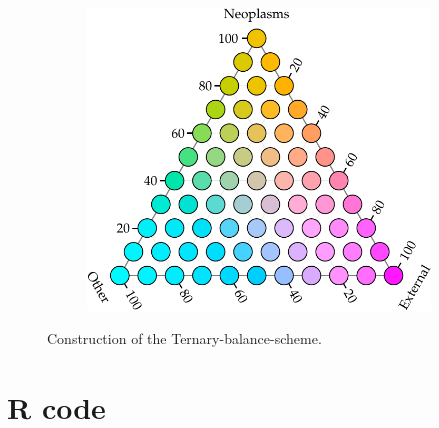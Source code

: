 \documentclass[a4paper]{scrartcl}
\begin{document}
\begin{appendix}
\begin{figure}[htb!]
\begin{subfigure}[t]{0.3\textwidth}
  \label{fig:ternlegend}
  \end{subfigure}%
  ~
  \begin{subfigure}[t]{0.3\textwidth}
  \includegraphics[width = \textwidth]{../fig/plot-tern_balance_lgnd.pdf}
  \label{fig:tbslegend}
  \end{subfigure}
  \caption{Con\-struc\-tion of the Ternary-balance-scheme.}
  \label{fig:tern_construction}
\end{figure}

\clearpage

\section{R code}


\clearpage

\clearpage

\clearpage

\clearpage

\clearpage

\clearpage

\clearpage

\clearpage


\end{appendix}
\end{document}
